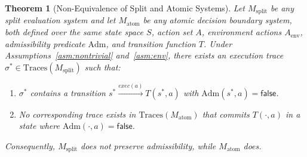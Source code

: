 \documentclass[11pt]{article}
\theoremstyle{plain}
\newtheorem{theorem}{Theorem}[section]
\theoremstyle{definition}
\theoremstyle{remark}
\newcommand{\Adm}{\mathrm{Adm}}
\newcommand{\Traces}{\mathrm{Traces}}
\begin{document}
\begin{theorem}[Non-Equivalence of Split and Atomic Systems]
\label{thm:main}
Let $M_{\mathrm{split}}$ be any split evaluation system and let
$M_{\mathrm{atom}}$ be any atomic decision boundary system, both defined
over the same state space $S$, action set $A$, environment actions
$A_{\mathrm{env}}$, admissibility predicate $\Adm$, and transition function
$T$.  Under Assumptions~\ref{asm:nontrivial} and~\ref{asm:env}, there exists an execution trace
$\sigma^* \in \Traces(M_{\mathrm{split}})$ such that:
\begin{enumerate}[label=(\roman*)]
  \item $\sigma^*$ contains a transition $s^* \xrightarrow{\mathit{exec}(a)}
    T(s^*, a)$ with $\Adm(s^*, a) = \mathsf{false}$.
  \item No corresponding trace exists in $\Traces(M_{\mathrm{atom}})$ that
    commits $T(\cdot, a)$ in a state where $\Adm(\cdot, a) = \mathsf{false}$.
\end{enumerate}
Consequently, $M_{\mathrm{split}}$ does not preserve admissibility, while
$M_{\mathrm{atom}}$ does.
\end{theorem}
\end{document}
